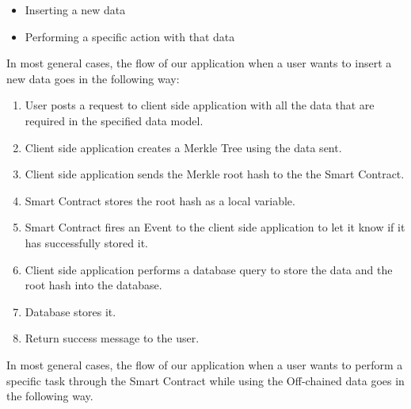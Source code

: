 \begin{itemize}
\item Inserting a new data
\item Performing a specific action with that data
\end{itemize}

In most general cases, the flow of our application when a user wants to insert a new data goes in the following way: 

\begin{enumerate}
\item User posts a request to client side application with all the data that are required in the specified data model. 
\item Client side application creates a Merkle Tree using the data sent.
\item Client side application sends the Merkle root hash to the the Smart Contract.
\item Smart Contract stores the root hash as a local variable.
\item Smart Contract fires an Event to the client side application to let it know if it has successfully stored it. 
\item Client side application performs a database query to store the data and the root hash into the database.
\item Database stores it.
\item Return success message to the user. 
\end{enumerate}

In most general cases, the flow of our application when a user wants to perform a specific task through the Smart Contract while using the Off-chained data goes in the following way. 


